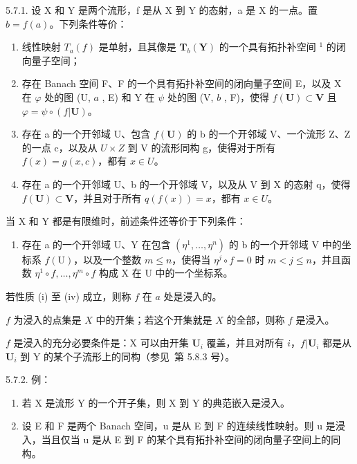 5.7.1. 设 X 和 Y 是两个流形，f 是从 X 到 Y 的态射，a 是 X 的一点。置 \(b = f(a)\)。下列条件等价：

\begin{enumerate}
\def\labelenumi{(\roman{enumi})}
\item
  线性映射 \(T_{a}(f)\) 是单射，且其像是 \(\mathbf{T}_{b}(\mathbf{Y})\) 的一个具有拓扑补空间 \(^{1}\) 的闭向量子空间；
\item
  存在 Banach 空间 F、F 的一个具有拓扑补空间的闭向量子空间 E，以及 X 在 \(\varphi\) 处的图 (U, \(a\) , E) 和 Y 在 \(\psi\) 处的图 (V, \(b\) , F)，使得 \(f(\mathbf{U}) \subset \mathbf{V}\) 且 \(\varphi = \psi \circ (f|\mathbf{U})\)。
\item
  存在 a 的一个开邻域 U、包含 \(f(\mathbf{U})\) 的 b 的一个开邻域 V、一个流形 Z、Z 的一点 c，以及从 \(U \times Z\) 到 V 的流形同构 g，使得对于所有 \(f(x) = g(x, c)\)，都有 \(x \in U\)。
\item
  存在 a 的一个开邻域 U、b 的一个开邻域 V，以及从 V 到 X 的态射 q，使得 \(f(\mathbf{U}) \subset \mathbf{V}\)，并且对于所有 \(q(f(x)) = x\)，都有 \(x \in U\)。
\end{enumerate}

当 X 和 Y 都是有限维时，前述条件还等价于下列条件：

\begin{enumerate}
\def\labelenumi{(\alph{enumi})}
\setcounter{enumi}{21}
\tightlist
\item
  存在 a 的一个开邻域 U、Y 在包含 \((\eta^{1},\ldots,\eta^{n})\) 的 b 的一个开邻域 V 中的坐标系 \(f(\mathrm{U})\)，以及一个整数 \(m\leqslant n\)，使得当 \(\eta^{j}\circ f=0\) 时 \(m<j\leqslant n\)，并且函数 \(\eta^{1}\circ f,\ldots,\eta^{m}\circ f\) 构成 X 在 U 中的一个坐标系。
\end{enumerate}

若性质 (i) 至 (iv) 成立，则称 \(f\) 在 \(a\) 处是浸入的。

\(f\) 为浸入的点集是 \(X\) 中的开集；若这个开集就是 \(X\) 的全部，则称 \(f\) 是浸入。

\(f\) 是浸入的充分必要条件是：X 可以由开集 \(\mathbf{U}_{i}\) 覆盖，并且对所有 \(i\)，\(f|\mathbf{U}_{i}\) 都是从 \(\mathbf{U}_{i}\) 到 Y 的某个子流形上的同构（参见~第 5.8.3 号）。

5.7.2. 例：

\begin{enumerate}
\def\labelenumi{(\alph{enumi})}
\item
  若 X 是流形 Y 的一个开子集，则 X 到 Y 的典范嵌入是浸入。
\item
  设 E 和 F 是两个 Banach 空间，u 是从 E 到 F 的连续线性映射。则 u 是浸入，当且仅当 u 是从 E 到 F 的某个具有拓扑补空间的闭向量子空间上的同构。
\end{enumerate}

